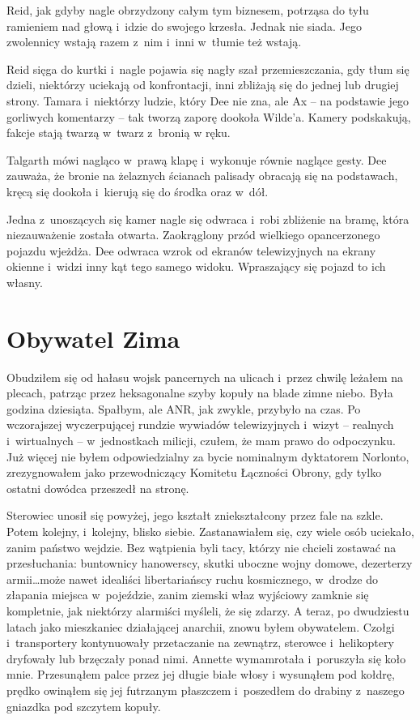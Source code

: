 \documentclass[oneside,polish,11pt,sfheadings]{mwbk}
\begin{document}
Reid, jak gdyby nagle obrzydzony całym tym biznesem, potrząsa do tyłu
ramieniem nad głową i~idzie do swojego krzesła. Jednak nie siada. Jego
zwolennicy wstają razem z~nim i~inni w~tłumie też wstają.

Reid sięga do kurtki i~nagle pojawia się nagły szał przemieszczania, gdy
tłum się dzieli, niektórzy uciekają od konfrontacji, inni zbliżają się
do jednej lub drugiej strony. Tamara i~niektórzy ludzie, który Dee nie
zna, ale Ax -- na podstawie jego gorliwych komentarzy -- tak tworzą zaporę
dookoła Wilde'a. Kamery podskakują, fakcje stają twarzą w~twarz z~bronią
w ręku.

Talgarth mówi nagląco w~prawą klapę i~wykonuje równie naglące gesty. Dee
zauważa, że bronie na żelaznych ścianach palisady obracają się na
podstawach, kręcą się dookoła i~kierują się do środka oraz w~dół.

Jedna z~unoszących się kamer nagle się odwraca i~robi zbliżenie na
bramę, która niezauważenie została otwarta. Zaokrąglony przód wielkiego
opancerzonego pojazdu wjeżdża. Dee odwraca wzrok od ekranów
telewizyjnych na ekrany okienne i~widzi inny kąt tego samego widoku.
Wpraszający się pojazd to ich własny.

\chapter{Obywatel Zima}


Obudziłem się od hałasu wojsk pancernych na ulicach i~przez chwilę
leżałem na plecach, patrząc przez heksagonalne szyby kopuły na blade
zimne niebo. Była godzina dziesiąta. Spałbym, ale ANR, jak zwykle,
przybyło na czas. Po wczorajszej wyczerpującej rundzie wywiadów
telewizyjnych i~wizyt -- realnych i~wirtualnych -- w~jednostkach milicji,
czułem, że mam prawo do odpoczynku. Już więcej nie byłem odpowiedzialny
za bycie nominalnym dyktatorem Norlonto, zrezygnowałem jako
przewodniczący Komitetu Łączności Obrony, gdy tylko ostatni dowódca
przeszedł na stronę.

Sterowiec unosił się powyżej, jego kształt zniekształcony przez fale na
szkle. Potem kolejny, i~kolejny, blisko siebie. Zastanawiałem się, czy
wiele osób uciekało, zanim państwo wejdzie. Bez wątpienia byli tacy,
którzy nie chcieli zostawać na przesłuchania: buntownicy hanowerscy,
skutki uboczne wojny domowe, dezerterzy armii\ldots może nawet idealiści
libertariańscy ruchu kosmicznego, w~drodze do złapania miejsca w~pojeździe, zanim ziemski właz wyjściowy zamknie się kompletnie, jak
niektórzy alarmiści myśleli, że się zdarzy. A teraz, po dwudziestu
latach jako mieszkaniec działającej anarchii, znowu byłem obywatelem.
Czołgi i~transportery kontynuowały przetaczanie na zewnątrz, sterowce i~helikoptery dryfowały lub brzęczały ponad nimi. Annette wymamrotała i~poruszyła się koło mnie. Przesunąłem palce przez jej długie białe włosy
i wysunąłem pod kołdrę, prędko owinąłem się jej futrzanym płaszczem i~poszedłem do drabiny z~naszego gniazdka pod szczytem kopuły.
\end{document}
